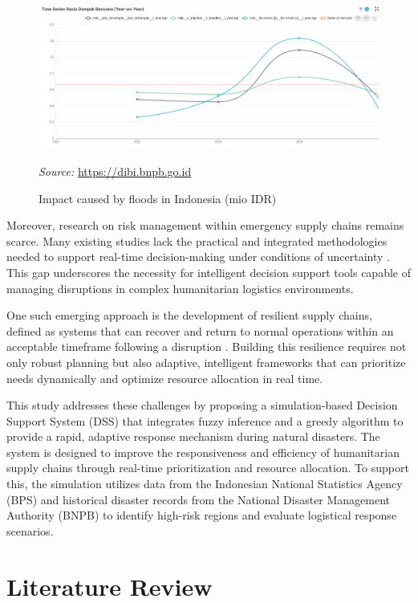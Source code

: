 \documentclass[journal,final,a4paper,twoside,11pt]{IEEEtran}
\begin{document}
\begin{figure}[htbp]
    \centerline{\includegraphics[width=0.8\linewidth]{fig3.png}}
    \caption{Impact caused by floods in Indonesia (mio IDR)}
    \label{fig:floodimpact}
    \vspace{0.2cm}
\footnotesize{\textit{Source:} \url{https://dibi.bnpb.go.id}}
\end{figure}

Moreover, research on risk management within emergency supply chains remains scarce. Many existing studies lack the practical and integrated methodologies needed to support real-time decision-making under conditions of uncertainty \cite{chukwuka2023comprehensive}. This gap underscores the necessity for intelligent decision support tools capable of managing disruptions in complex humanitarian logistics environments.

One such emerging approach is the development of resilient supply chains, defined as systems that can recover and return to normal operations within an acceptable timeframe following a disruption \cite{orengo2022food}. Building this resilience requires not only robust planning but also adaptive, intelligent frameworks that can prioritize needs dynamically and optimize resource allocation in real time.

This study addresses these challenges by proposing a simulation-based Decision Support System (DSS) that integrates fuzzy inference and a greedy algorithm to provide a rapid, adaptive response mechanism during natural disasters. The system is designed to improve the responsiveness and efficiency of humanitarian supply chains through real-time prioritization and resource allocation. To support this, the simulation utilizes data from the Indonesian National Statistics Agency (BPS) and historical disaster records from the National Disaster Management Authority (BNPB) to identify high-risk regions and evaluate logistical response scenarios.

\section{Literature Review}
\end{document}
